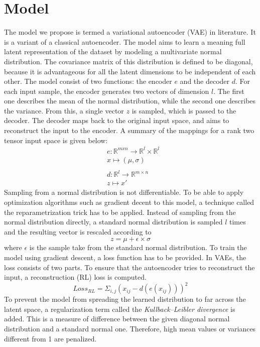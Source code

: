 \documentclass[journal]{Imperial_lab_report}
\begin{document}
\section{Model}
The model we propose is termed a variational autoencoder (VAE) in literature. It is a variant of a classical autoencoder. The model aims to learn a meaning full latent representation of the dataset by modeling a multivariate normal distribution. The covariance matrix of this distribution is defined to be diagonal, because it is advantageous for all the latent dimensions to be independent of each other. The model consist of two functions: the encoder $e$ and the decoder $d$. For each input sample, the encoder generates two vectors of dimension $l$. The first one describes the mean of the normal distribution, while the second one describes the variance. From this, a single vector $z$ is sampled, which is passed to the decoder. The decoder maps back to the original input space, and aims to reconstruct the input to the encoder. A summary of the mappings for a rank two tensor input space is given below:
\begin{align*}
&e: \mathbb{R}^{m x n}\rightarrow\mathbb{R}^l \times \mathbb{R}^l \\
&x \mapsto (\mu, \sigma) \\
\\
&d: \mathbb{R}^{l}\rightarrow\mathbb{R}^{m \times n} \\
&z \mapsto x'
\end{align*}
Sampling from a normal distribution is not differentiable. To be able to apply optimization algorithms such as gradient decent to this model, a technique called the reparametrization trick has to be applied. Instead of sampling from the normal distribution directly, a standard normal distribution is sampled $l$ times and the resulting vector is rescaled according to
\begin{equation}
    z = \mu + \epsilon \times \sigma
\end{equation}
where $\epsilon$ is the sample take from the standard normal distribution.
To train the model using gradient descent, a loss function has to be provided. In VAEs, the loss consists of two parts. To ensure that the autoencoder tries to reconstruct the input, a reconstruction (RL) loss is computed.
\begin{equation}
    Loss_{RL} = \Sigma_{i,j} (x_{ij} - d(e(x_{ij})))^2
\end{equation}
To prevent the model from spreading the learned distribution to far across the latent space, a regularization term called the \emph{Kullback–Leibler divergence} is added. This is a measure of difference between the given diagonal normal distribution and a standard normal one. Therefore, high mean values or variances different from 1 are penalized.
\end{document}
